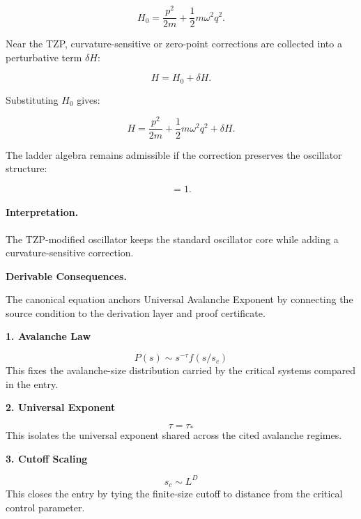 \begin{equation}
H_0
=
\frac{p^2}{2m}
+
\frac{1}{2}m\omega^2 q^2 .
\end{equation}

Near the TZP, curvature-sensitive or zero-point corrections are collected into a perturbative term $\delta H$:

\begin{equation}
H = H_0+\delta H .
\end{equation}

Substituting $H_0$ gives:

\begin{equation}
\boxed{
H
=
\frac{p^2}{2m}
+
\frac{1}{2}m\omega^2 q^2
+
\delta H .
}
\end{equation}

The ladder algebra remains admissible if the correction preserves the oscillator structure:

\begin{equation}
[a,a^\dagger]=1 .
\end{equation}

\paragraph{Interpretation.}
The TZP-modified oscillator keeps the standard oscillator core while adding a curvature-sensitive correction.

\par\vspace{0.35em}
\noindent\textbf{Derivable Consequences.}\quad
\begingroup
\footnotesize
\raggedright
The canonical equation anchors Universal Avalanche Exponent by connecting the source condition to the derivation layer and proof certificate.
\par\endgroup

\noindent\textbf{1. Avalanche Law}\par
\[
P(s)\sim s^{-\tau}f(s/s_{c})
\]
\noindent This fixes the avalanche-size distribution carried by the critical systems compared in the entry.\par
\noindent\textbf{2. Universal Exponent}\par
\[
\tau=\tau_{\ast}
\]
\noindent This isolates the universal exponent shared across the cited avalanche regimes.\par
\noindent\textbf{3. Cutoff Scaling}\par
\[
s_{c}\sim L^{D}
\]
\noindent This closes the entry by tying the finite-size cutoff to distance from the critical control parameter.\par

